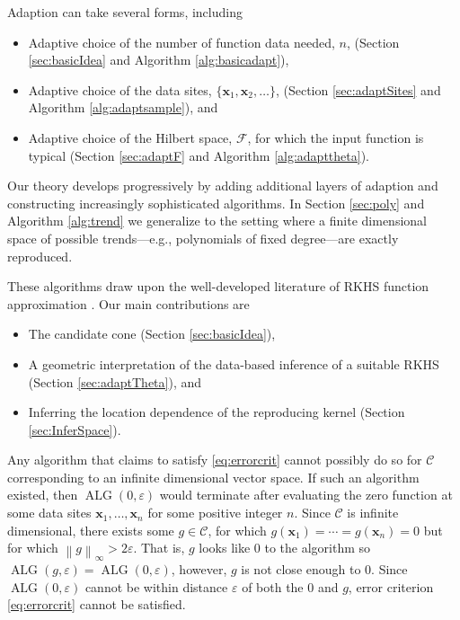 \documentclass[]{mcom-l}
\theoremstyle{theorem}
\theoremstyle{remark}
\DeclareMathOperator{\ALG}{ALG}
\newcommand{\bx}{{\boldsymbol{x}}}
\newcommand{\cc}{\mathcal{C}}
\newcommand{\calf}{{\mathcal{F}}}
\newcommand{\norm}[2][{}]{\ensuremath{\left \lVert #2 \right \rVert}_{#1}}
\begin{document}
Adaption can take several forms, including
\begin{itemize}
    \item Adaptive choice of the number of function data needed, $n$, (Section \ref{sec:basicIdea} and Algorithm \ref{alg:basicadapt}),
    \item Adaptive choice of the data sites, $\{\bx_1, \bx_2, \ldots\}$,  (Section \ref{sec:adaptSites} and Algorithm \ref{alg:adaptsample}), and
    \item Adaptive choice of the Hilbert space, $\calf$, for which the input function is typical  (Section \ref{sec:adaptF} and Algorithm \ref{alg:adapttheta}).
\end{itemize}
Our theory develops progressively by adding additional layers of adaption and constructing increasingly sophisticated algorithms.  In Section \ref{sec:poly} and Algorithm \ref{alg:trend} we generalize to the setting where a finite dimensional space of possible trends---e.g., polynomials of fixed degree---are exactly reproduced.

These algorithms draw upon the well-developed literature of RKHS function approximation \cite{Buh03a,Fas07a,FasMcC15a,ForFly15a,ForEtal09,RasWil06a,SchWen06a,Wah85a,Wen05a}.  Our main contributions are 
\begin{itemize}
	\item The candidate cone (Section \ref{sec:basicIdea}),
	\item A geometric interpretation of the data-based inference of a suitable RKHS (Section  \ref{sec:adaptTheta}), and
	\item Inferring the location dependence of the reproducing kernel (Section \ref{sec:InferSpace}).
\end{itemize}

Any algorithm that claims to satisfy \eqref{eq:errorcrit} cannot possibly do so for $\cc$ corresponding to an infinite dimensional vector space.  If such an algorithm existed, then $\ALG(0,\varepsilon)$ would terminate after evaluating the zero function at some data sites $\bx_1, \ldots, \bx_n$ for some positive integer $n$.  Since $\cc$ is infinite dimensional, there exists some $g \in \cc$, for which $g(\bx_1) = \cdots = g(\bx_n) = 0$ but for which $\norm[\infty]{g} > 2 \varepsilon$.  That is, $g$ looks like  $0$ to the algorithm so $\ALG(g,\varepsilon) = \ALG(0,\varepsilon)$, however, $g$ is not close enough to $0$.   Since $\ALG(0,\varepsilon)$ cannot be within distance $\varepsilon$ of both the $0$ and $g$, error criterion \eqref{eq:errorcrit} cannot be satisfied.
\end{document}
